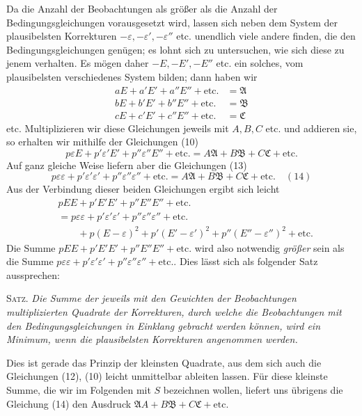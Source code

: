 Da die Anzahl der Beobachtungen als größer als die Anzahl der Bedingungsgleichungen vorausgesetzt wird, lassen sich neben dem System der plausibelsten Korrekturen \(-\varepsilon,-\varepsilon',-\varepsilon''\) etc. unendlich viele andere finden, die den Bedingungsgleichungen genügen; es lohnt sich zu untersuchen, wie sich diese zu jenem verhalten. Es mögen daher \(-E,-E',-E''\) etc. ein solches, vom plausibelsten verschiedenes System bilden; dann haben wir
\[
\begin{aligned}
aE+a'E'+a''E''+\text{etc.}&=\mathfrak A\\
bE+b'E'+b''E''+\text{etc.}&=\mathfrak B\\
cE+c'E'+c''E''+\text{etc.}&=\mathfrak C
\end{aligned}
\]
etc. Multiplizieren wir diese Gleichungen jeweils mit \(A,B,C\) etc. und addieren sie, so erhalten wir mithilfe der Gleichungen (10)
\[
p\varepsilon E+p'\varepsilon'E'+p''\varepsilon''E''+\text{etc.}=A\mathfrak A+B\mathfrak B+C\mathfrak C+\text{etc.}
\]
Auf ganz gleiche Weise liefern aber die Gleichungen (13)
\[
p\varepsilon\varepsilon+p'\varepsilon'\varepsilon'+p''\varepsilon''\varepsilon''+\text{etc.}=A\mathfrak A+B\mathfrak B+C\mathfrak C+\text{etc.}\quad(14)
\]
Aus der Verbindung dieser beiden Gleichungen ergibt sich leicht
\[
\begin{aligned}
&pEE+p'E'E'+p''E''E''+\text{etc.}\\
&=p\varepsilon\varepsilon+p'\varepsilon'\varepsilon'+p''\varepsilon''\varepsilon''+\text{etc.}
\\&\qquad+p(E-\varepsilon)^2+p'(E'-\varepsilon')^2+p''(E''-\varepsilon'')^2+\text{etc.}
\end{aligned}
\]
Die Summe \(pEE+p'E'E'+p''E''E''+\text{etc.}\) wird also notwendig \textit{größer} sein als die Summe \(p\varepsilon\varepsilon+p'\varepsilon'\varepsilon'+p''\varepsilon''\varepsilon''+\text{etc.}\). Dies lässt sich als folgender Satz aussprechen:

\textsc{Satz.} \textit{Die Summe der jeweils mit den Gewichten der Beobachtungen multiplizierten Quadrate der Korrekturen, durch welche die Beobachtungen mit den Bedingungsgleichungen in Einklang gebracht werden können, wird ein Minimum, wenn die plausibelsten Korrekturen angenommen werden.}

Dies ist gerade das Prinzip der kleinsten Quadrate, aus dem sich auch die Gleichungen (12), (10) leicht unmittelbar ableiten lassen. Für diese kleinste Summe, die wir im Folgenden mit \(S\) bezeichnen wollen, liefert uns übrigens die Gleichung (14) den Ausdruck \(\mathfrak A A+B\mathfrak B+C\mathfrak C+\text{etc.}\)

\clearpage
